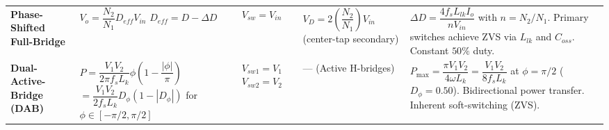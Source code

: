 \begin{center}
\begin{tabularx}{\textwidth}{@{} >{\raggedright\arraybackslash}p{2.6cm} >{\raggedright\arraybackslash}p{3.2cm} >{\raggedright\arraybackslash}p{2.4cm} >{\raggedright\arraybackslash}p{2.8cm} >{\raggedright\arraybackslash}X @{}}
\textbf{Phase-Shifted Full-Bridge} &
$V_o = \dfrac{N_2}{N_1} D_{eff} V_{in}$ \newline
$D_{eff} = D - \Delta D$ &
$V_{sw} = V_{in}$ &
$V_D = 2 \left(\dfrac{N_2}{N_1}\right) V_{in}$ \newline
(center-tap secondary) &
$\Delta D = \dfrac{4 f_s L_{lk} I_o}{n V_{in}}$ with $n = N_2/N_1$. Primary switches achieve ZVS via $L_{lk}$ and $C_{oss}$. Constant $50\%$ duty. \\

\textbf{Dual-Active-Bridge (DAB)} &
$P = \dfrac{V_1 V_2}{2\pi f_s L_k}\phi\left(1 - \dfrac{|\phi|}{\pi}\right)$ \newline
$= \dfrac{V_1 V_2}{2 f_s L_k} D_\phi (1 - |D_\phi|)$ \newline
for $\phi \in [-\pi/2, \pi/2]$ &
$V_{sw1} = V_1$ \newline
$V_{sw2} = V_2$ &
--- (Active H-bridges) &
$P_{\max} = \dfrac{\pi V_1 V_2}{4 \omega L_k} = \dfrac{V_1 V_2}{8 f_s L_k}$ at $\phi = \pi/2$ ($D_\phi = 0.50$). Bidirectional power transfer. Inherent soft-switching (ZVS). \\
\bottomrule
\end{tabularx}
\vspace{-4pt}
\end{center}

\vspace{-10pt}

